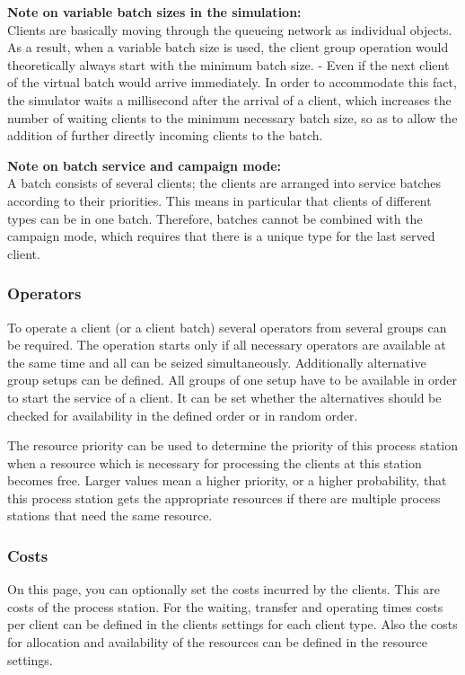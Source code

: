 \textbf{Note on variable batch sizes in the simulation:}~\\
Clients are basically moving through the queueing network as individual objects.
As a result, when a variable batch size is used, the client group operation would theoretically always
start with the minimum batch size. - Even if the next client of the virtual batch would arrive immediately.
In order to accommodate this fact, the simulator waits a millisecond after the arrival of a client, which
increases the number of waiting clients to the minimum necessary batch size, so as to allow the addition
of further directly incoming clients to the batch.

\textbf{Note on batch service and campaign mode:}~\\
A batch consists of several clients; the clients are arranged into service batches according to their priorities.
This means in particular that clients of different types can be in one batch. Therefore, batches cannot
be combined with the campaign mode, which requires that there is a unique type for the last served client.

\subsubsection*{Operators}

To operate a client (or a client batch) several operators from several groups can be required.
The operation starts only if all necessary operators are available at the same time and all can be seized
simultaneously.
Additionally alternative group setups can be defined. All groups of one setup have to be available in order
to start the service of a client. 
It can be set whether the alternatives should be checked for availability in the defined order or in random order.

The resource priority can be used to determine the priority of this process station when a resource
which is necessary for processing the clients at this station becomes free. Larger values mean a
higher priority, or a higher probability, that this process station gets the appropriate resources
if there are multiple process stations that need the same resource.

\subsubsection*{Costs}

On this page, you can optionally set the costs incurred by the clients. This are costs of the process station.
For the waiting, transfer and operating times costs per client can be defined in the clients settings for each
client type. Also the costs for allocation and availability of the resources can be defined in the resource settings.

